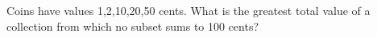 Coins have values 1,2,10,20,50 cents. What is the greatest total value of a collection from which no subset sums to 100 cents?
